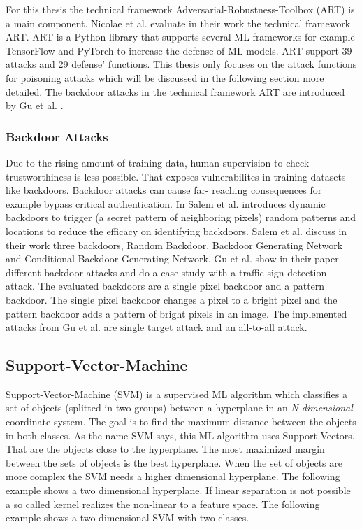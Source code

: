 For this thesis the technical framework Adversarial-Robustness-Toolbox (ART) \cite{art2018} is a main component. Nicolae et al. \cite{DBLP:journals/corr/abs-1807-01069} evaluate in their work the
technical framework ART. ART is a Python library that supports several ML frameworks for example TensorFlow and PyTorch to increase the defense of ML models. ART support 39 attacks and 29 defense'
functions. This thesis only focuses on the attack functions for poisoning attacks which will be discussed in the following section more detailed. The backdoor attacks in the technical framework
ART are introduced by Gu et al. \cite{DBLP:journals/corr/abs-1708-06733}.

\subsubsection*{Backdoor Attacks}
\label{sec:backdoor}
Due to the rising amount of training data, human supervision to check trustworthiness is less possible. That exposes vulnerabilites in training datasets like backdoors. Backdoor attacks can cause far-
reaching consequences for example bypass critical authentication. In \cite{DBLP:journals/corr/abs-2003-03675} Salem et al. introduces dynamic backdoors to trigger (a secret pattern of neighboring
pixels) random patterns and locations to reduce the efficacy on identifying backdoors. Salem et al. discuss in their work three backdoors, Random Backdoor, Backdoor Generating Network and Conditional
Backdoor Generating Network.
Gu et al. show in their paper different backdoor attacks and do a case study with a traffic sign detection attack. The evaluated backdoors are a single pixel backdoor and a pattern backdoor. The single
pixel backdoor changes a pixel to a bright pixel and the pattern backdoor adds a pattern of bright pixels in an image. The implemented attacks from Gu et al. are single target attack and an all-to-all attack.

\subsection{Support-Vector-Machine}

Support-Vector-Machine (SVM) is a supervised ML algorithm which classifies a set of objects (splitted in two groups) between a hyperplane in an \textit{N-dimensional} coordinate system. The goal is to find the maximum distance between the objects in both classes. As the name SVM says, this ML algorithm uses Support Vectors. That are the objects close to the hyperplane. The most maximized margin between the sets of objects is the best hyperplane. When the set of objects are more complex the SVM needs a higher dimensional hyperplane. The following example shows a two dimensional hyperplane. If linear separation is not possible a so called kernel realizes the non-linear to a feature space. The following example shows a two dimensional SVM with two classes. \\ \\

